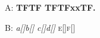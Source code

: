 \documentclass{amsart}
\makeatletter
\def\sh{[\f@shape]}
\makeatother
\begin{document}
\let\x\bfseries \let\y\ttfamily
\DeclareRobustCommand\ra{x}\DeclareRobustCommand\rb{x}
A: \ifx\x\bfseries T\else F\fi\ifx\reset@font\normalfont T\else F\fi
\ifx\y\ttfamily T\else F\fi\ifx\x\ttfamily T\else F\fi\ifx\ra\rb T\else F\fi.

B: {\itshape a\sh\nonslanted b\sh} {\slshape c\sh\nonslanted d\sh} {\scshape e\sh\nonslanted f\sh}
\end{document}
